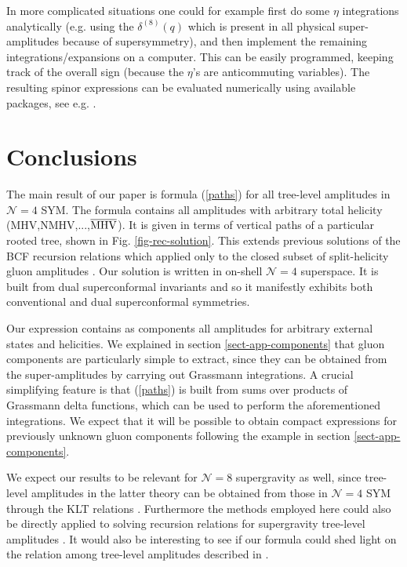 \documentclass[12pt]{article}
\def\bMHV{\overline{\rm MHV}}
\begin{document}
{In more complicated situations one could for example first do some
$\eta$ integrations analytically
(e.g. using the $\delta^{(8)}(q)$ which is present in all physical
super-amplitudes because of supersymmetry),
and then implement the remaining integrations/expansions on a computer.
This can be easily programmed, keeping track of the overall sign
(because the $\eta$'s are anticommuting variables).
The resulting spinor expressions can be evaluated numerically using
available packages, see e.g. \cite{Maitre:2007jq}.


\section{Conclusions}\label{sect-conclusions}

The main result of our paper is formula (\ref{paths}) for all
tree-level amplitudes in $\mathcal{N}=4$ SYM. The formula contains all
amplitudes with arbitrary total helicity (MHV,NMHV,...,$\bMHV$).
It is given in terms of vertical paths of a particular rooted tree,
shown in Fig. \ref{fig-rec-solution}.
This extends previous solutions of the BCF recursion relations which
applied only to the closed subset of split-helicity gluon amplitudes
\cite{Britto:2005dg}.
Our solution is written in on-shell $\mathcal{N}=4$ superspace. It is
built from dual superconformal invariants and so it manifestly
exhibits both conventional and dual superconformal symmetries.

Our expression contains as components all amplitudes for arbitrary external
states and helicities. We explained in section
\ref{sect-app-components} that gluon components are particularly
simple to extract, since they can be obtained from the
super-amplitudes by carrying out
Grassmann integrations. A crucial simplifying feature is that
(\ref{paths}) is built from
sums over products of Grassmann delta functions, which can be used to
perform the aforementioned
integrations. We expect that it will be possible to obtain compact
expressions for previously
unknown gluon components following the example in section
\ref{sect-app-components}.

We expect our results to be relevant for $\mathcal{N}=8$ supergravity
as well, since tree-level amplitudes
in the latter theory can be obtained from those in $\mathcal{N}=4$ SYM
through the KLT relations \cite{Kawai:1985xq}. Furthermore the methods
employed here could also be directly applied to solving recursion
relations for supergravity tree-level amplitudes
\cite{ArkaniHamed:2008yf}. It would also be interesting to see if our
formula could shed light on the relation among tree-level amplitudes
described in  \cite{Bern:2008qj}.

}
\end{document}
